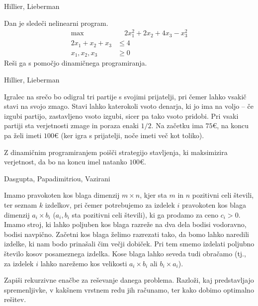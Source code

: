 \begin{naloga}{Hillier, Lieberman}{\cite[Problem~11.3-16]{hl}}
\begin{vprasanje}
Dan je sledeči nelinearni program.
\begin{align*}
\max &\quad 2x_1^2 + 2x_2 + 4x_3 - x_3^2 \\[1ex]
2x_1 + x_2 + x_3 &\le 4 \\
x_1, x_2, x_3 &\ge 0
\end{align*}
Reši ga s pomočjo dinamičnega programiranja.

\end{vprasanje}
\begin{odgovor}
\end{odgovor}
\end{naloga}


\begin{naloga}{Hillier, Lieberman}{\cite[Problem~11.4-1]{hl}}
\begin{vprasanje}
Igralec na srečo bo odigral tri partije s svojimi prijatelji,
pri čemer lahko vsakič stavi na svojo zmago.
Stavi lahko katerokoli vsoto denarja, ki jo ima na voljo
-- če izgubi partijo, zastavljeno vsoto izgubi, sicer pa tako vsoto pridobi.
Pri vsaki partiji sta verjetnosti zmage in poraza enaki $1/2$.
Na začetku ima $75 €$, na koncu pa želi imeti $100 €$
(ker igra s prijatelji, noče imeti več kot toliko).

Z dinamičnim programiranjem poišči strategijo stavljenja,
ki maksimizira verjetnost, da bo na koncu imel natanko $100 €$.
\end{vprasanje}
\begin{odgovor}
\end{odgovor}
\end{naloga}


\begin{naloga}%
{Dasgupta, Papadimitriou, Vazirani}{\cite[Exercise~6.14]{dpv}}
\begin{vprasanje}[blago]
Imamo pravokoten kos blaga dimenzij $m \times n$,
kjer sta $m$ in $n$ pozitivni celi števili,
ter seznam $k$ izdelkov,
pri čemer potrebujemo za izdelek $i$
pravokoten kos blaga dimenzij $a_i \times b_i$
($a_i, b_i$ sta pozitivni celi števili),
ki ga prodamo za ceno $c_i > 0$.
Imamo stroj, ki lahko poljuben kos blaga razreže na dva dela
bodisi vodoravno, bodisi navpično.
Začetni kos blaga želimo razrezati tako,
da bomo lahko naredili izdelke,
ki nam bodo prinašali čim večji dobiček.
Pri tem smemo izdelati poljubno število kosov posameznega izdelka.
Kose blaga lahko seveda tudi obračamo
(tj., za izdelek $i$ lahko narežemo kos velikosti
$a_i \times b_i$ ali $b_i \times a_i$).

Zapiši rekurzivne enačbe za reševanje danega problema.
Razloži, kaj predstavljajo spremenljivke,
v kakšnem vrstnem redu jih računamo,
ter kako dobimo optimalno rešitev.
\end{vprasanje}
\begin{odgovor}
\end{odgovor}
\end{naloga}


